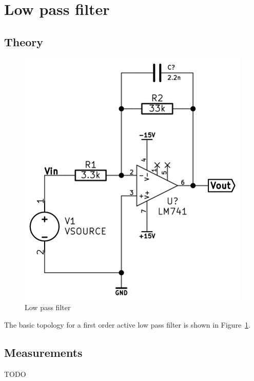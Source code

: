 \documentclass[11pt,a4paper]{article}
\begin{document}
\section{Low pass filter}\label{lowpass-filter}

\subsection{Theory}\label{lpf-theory}
\begin{figure}[htbp]
    \centering
        \includegraphics[scale=0.5]{img/lowpassfilter.png}
    \caption{Low pass filter}
    \label{fig:lpf-schem}
\end{figure}

The basic topology for a first order active low pass filter is shown in Figure~\ref{fig:lpf-schem}.

\subsection{Measurements}\label{lpf-measurements}
TODO
\end{document}
